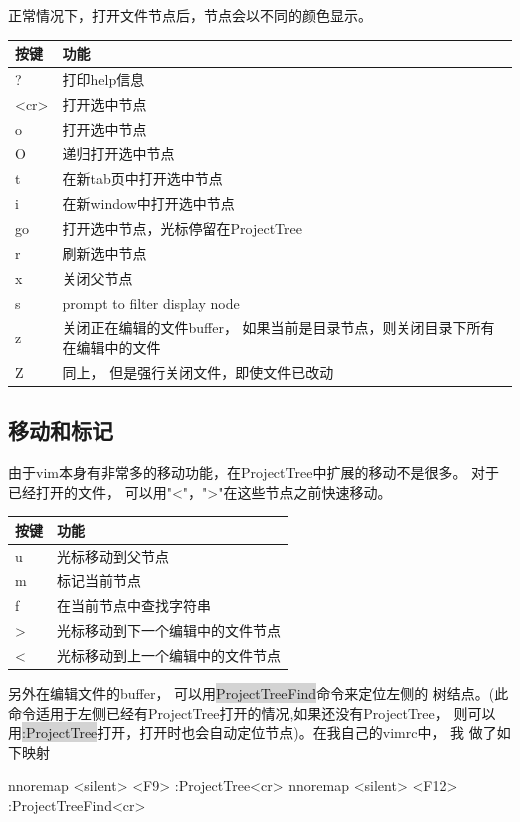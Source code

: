 \documentclass[oneside,openany]{book}
\begin{document}
  正常情况下，打开文件节点后，节点会以不同的颜色显示。
  \begin{table}[H]
  \centering
      \begin{tabular}{p{40pt}p{220pt}}
        \toprule
        按键& 功能\\
        \midrule
          ?     &打印help信息\\
          <cr>  &打开选中节点\\
          o     &打开选中节点\\
          O     &递归打开选中节点\\
          t     &在新tab页中打开选中节点\\
          i     &在新window中打开选中节点\\
          go    &打开选中节点，光标停留在ProjectTree\\
          r     &刷新选中节点\\
          x     &关闭父节点\\
          s     &prompt to filter display node\\
          z     &关闭正在编辑的文件buffer， 如果当前是目录节点，则关闭目录下所有在编辑中的文件\\
          Z     &同上， 但是强行关闭文件，即使文件已改动\\
      \bottomrule
      \end{tabular}
  \end{table}

  \subsection{移动和标记}
  由于vim本身有非常多的移动功能，在ProjectTree中扩展的移动不是很多。 对于已经打开的文件，
可以用"<"，">"在这些节点之前快速移动。
  \begin{table}[H]
  \centering
      \begin{tabular}{p{40pt}p{220pt}}
        \toprule
        按键& 功能\\
        \midrule
          u     &光标移动到父节点\\
          m     &标记当前节点\\
          f     &在当前节点中查找字符串\\
          >     &光标移动到下一个编辑中的文件节点\\
          <     &光标移动到上一个编辑中的文件节点\\
      \bottomrule
      \end{tabular}
  \end{table}
  另外在编辑文件的buffer， 可以用\colorbox{lightgray}{ProjectTreeFind}命令来定位左侧的
树结点。(此命令适用于左侧已经有ProjectTree打开的情况,如果还没有ProjectTree，
则可以用\colorbox{lightgray}{:ProjectTree}打开，打开时也会自动定位节点)。在我自己的vimrc中， 我
做了如下映射
  \begin{mdframed}[style=SmallFrame]
    \begin{flushleft}
      nnoremap <silent> <F9>  :ProjectTree<cr>\newline
      nnoremap <silent> <F12> :ProjectTreeFind<cr>
    \end{flushleft}
  \end{mdframed}
\end{document}
